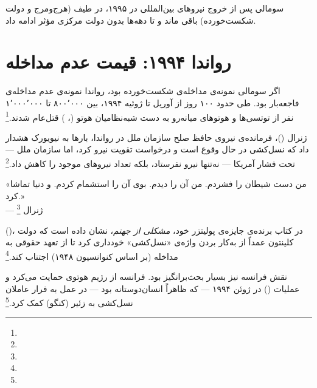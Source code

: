 سومالی پس از خروج نیروهای بین‌المللی در ۱۹۹۵، در طیف  (هرج‌ومرج و دولت شکست‌خورده) باقی ماند و تا دهه‌ها بدون دولت مرکزی مؤثر ادامه داد.


\section{رواندا ۱۹۹۴: قیمت عدم مداخله}
\label{sec:ch10-rwanda}

اگر سومالی نمونه‌ی مداخله‌ی شکست‌خورده بود، رواندا نمونه‌ی عدم مداخله‌ی فاجعه‌بار بود. طی حدود ۱۰۰ روز از آوریل تا ژوئیه ۱۹۹۴، بین ۸۰۰٬۰۰۰ تا ۱٬۰۰۰٬۰۰۰ نفر از توتسی‌ها و هوتوهای میانه‌رو به دست شبه‌نظامیان هوتو (، ) قتل‌عام شدند.\footnote{}

ژنرال  ()، فرمانده‌ی نیروی حافظ صلح سازمان ملل در رواندا، بارها به نیویورک هشدار داد که نسل‌کشی در حال وقوع است و درخواست تقویت نیرو کرد، اما سازمان ملل — تحت فشار آمریکا — نه‌تنها نیرو نفرستاد، بلکه تعداد نیروهای موجود را کاهش داد.\footnote{}

\begin{tcolorbox}[quotebox, title={نقل‌قول تاریخی}]
«من دست شیطان را فشردم. من آن را دیدم. بوی آن را استشمام کردم. و دنیا تماشا کرد.»\\
— ژنرال \footnote{}
\end{tcolorbox}

 ()، در کتاب برنده‌ی جایزه‌ی پولیتزر خود، \textit{مشکلی از جهنم}، نشان داده است که دولت کلینتون عمداً از به‌کار بردن واژه‌ی «نسل‌کشی» خودداری کرد تا از تعهد حقوقی به مداخله (بر اساس کنوانسیون ۱۹۴۸) اجتناب کند.\footnote{}

نقش فرانسه نیز بسیار بحث‌برانگیز بود. فرانسه از رژیم هوتوی  حمایت می‌کرد و عملیات  () در ژوئن ۱۹۹۴ — که ظاهراً انسان‌دوستانه بود — در عمل به فرار عاملان نسل‌کشی به زئیر (کنگو) کمک کرد.\footnote{}

